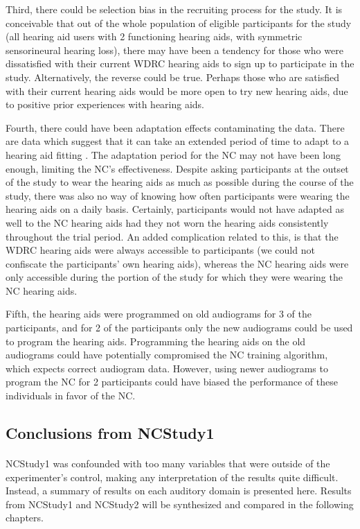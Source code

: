 Third, there could be selection bias in the recruiting process for the study.  It is conceivable that out of the whole population of eligible participants for the study (all hearing aid users with 2 functioning hearing aids, with symmetric sensorineural hearing loss), there may have been a tendency for those who were dissatisfied with their current WDRC hearing aids to sign up to participate in the study.  Alternatively, the reverse could be true.  Perhaps those who are satisfied with their current hearing aids would be more open to try new hearing aids, due to positive prior experiences with hearing aids.

Fourth, there could have been adaptation effects contaminating the data.  There are data which suggest that it can take an extended period of time to adapt to a hearing aid fitting \cite{Brooks1996}.  The adaptation period for the NC may not have been long enough, limiting the NC's effectiveness.  Despite asking participants at the outset of the study to wear the hearing aids as much as possible during the course of the study, there was also no way of knowing how often participants were wearing the hearing aids on a daily basis.  Certainly, participants would not have adapted as well to the NC hearing aids had they not worn the hearing aids consistently throughout the trial period.  An added complication related to this, is that the WDRC hearing aids were always accessible to participants (we could not confiscate the participants' own hearing aids), whereas the NC hearing aids were only accessible during the portion of the study for which they were wearing the NC hearing aids.

Fifth, the hearing aids were programmed on old audiograms for 3 of the participants, and for 2 of the participants only the new audiograms could be used to program the hearing aids.  Programming the hearing aids on the old audiograms could have potentially compromised the NC training algorithm, which expects correct audiogram data.  However, using newer audiograms to program the NC for 2 participants could have biased the performance of these individuals in favor of the NC.

\subsection{Conclusions from NCStudy1}
\paragraph{}NCStudy1 was confounded with too many variables that were outside of the experimenter's control, making any interpretation of the results quite difficult.  Instead, a summary of results on each auditory domain is presented here.  Results from NCStudy1 and NCStudy2 will be synthesized and compared in the following chapters.

